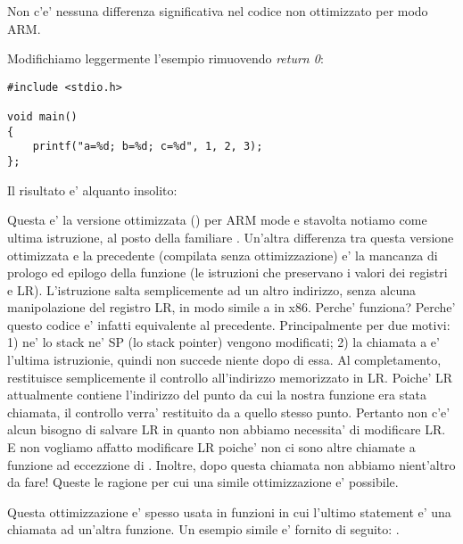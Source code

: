 Non c'e' nessuna differenza significativa nel codice non ottimizzato per modo ARM.

\label{ARM_B_to_printf}

Modifichiamo leggermente l'esempio rimuovendo \emph{return 0}:

\begin{lstlisting}[style=customc]
#include <stdio.h>

void main()
{
	printf("a=%d; b=%d; c=%d", 1, 2, 3);
};
\end{lstlisting}

Il risultato e' alquanto insolito:



Questa e' la versione ottimizzata (\Othree) per ARM mode e stavolta notiamo  come ultima istruzione, al posto della familiare .
Un'altra differenza tra questa versione ottimizzata e la precedente (compilata senza ottimizzazione)
e' la mancanza di prologo ed epilogo della funzione (le istruzioni che preservano i valori dei registri  e \ac{LR}).
L'istruzione  salta semplicemente ad un altro indirizzo, senza alcuna manipolazione del registro \ac{LR}, in modo simile
a \JMP in x86.
Perche' funziona? Perche' questo codice e' infatti equivalente al precedente.
Principalmente per due motivi: 1) ne' lo stack ne' \ac{SP} (lo \gls{stack pointer}) vengono modificati;
2) la chiamata a \printf e' l'ultima istruzionie, quindi non succede niente dopo di essa.
Al completamento, \printf restituisce semplicemente il controllo all'indirizzo memorizzato in \ac{LR}.
Poiche' \ac{LR} attualmente contiene l'indirizzo del punto da cui la nostra funzione era stata chiamata, 
il controllo verra' restituito da \printf a quello stesso punto.
Pertanto non c'e' alcun bisogno di salvare \ac{LR} in quanto non abbiamo necessita' di modificare \ac{LR}.
E non vogliamo affatto modificare \ac{LR} poiche' non ci sono altre chiamate a funzione ad eccezzione di \printf. Inoltre, dopo
questa chiamata non abbiamo nient'altro da fare!
Queste le ragione per cui una simile ottimizzazione e' possibile.

Questa ottimizzazione e' spesso usata in funzioni in cui l'ultimo statement e' una chiamata ad un'altra funzione.
Un esempio simile e' fornito di seguito:
.


